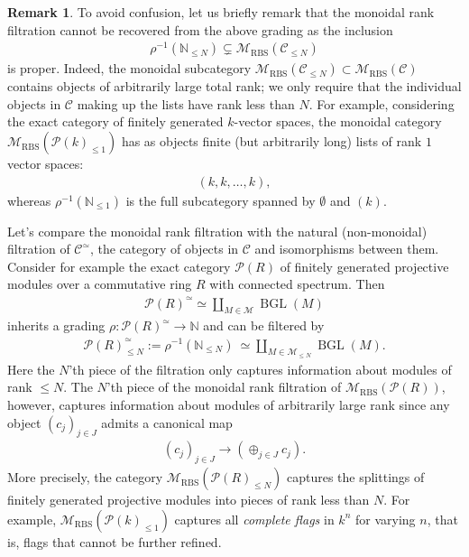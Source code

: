 \documentclass[12pt, reqno]{amsart}
\theoremstyle{plain}
\theoremstyle{definition}
\newtheorem{remark}[theorem]{Remark}
\newcommand{\N}{\mathbb N}
\begin{document}
\begin{remark}
To avoid confusion, let us briefly remark that the monoidal rank filtration cannot be recovered from the above grading as the inclusion
\begin{align*}
\rho^{-1}(\N_{\leq N})\subsetneq \mathscr{M}_{\operatorname{RBS}}(\mathcal{C}_{\leq N})
\end{align*}
is proper. Indeed, the monoidal subcategory $\mathscr{M}_{\operatorname{RBS}}(\mathcal{C}_{\leq N})\subset \mathscr{M}_{\operatorname{RBS}}(\mathcal{C})$ contains objects of arbitrarily large total rank; we only require that the individual objects in $\mathcal{C}$ making up the lists have rank less than $N$. For example, considering the exact category of finitely generated $k$-vector spaces, the monoidal category $\mathscr{M}_{\operatorname{RBS}}(\mathcal{P}(k)_{\leq 1})$ has as objects finite (but arbitrarily long) lists of rank $1$ vector spaces:
\begin{align*}
(k,k,\ldots,k),
\end{align*}
whereas $\rho^{-1}(\N_{\leq 1})$ is the full subcategory spanned by $\emptyset$ and $(k)$.

Let's compare the monoidal rank filtration with the natural (non-monoidal) filtration of $\mathcal{C}^\simeq$, the category of objects in $\mathcal{C}$ and isomorphisms between them. Consider for example the exact category $\mathcal{P}(R)$ of finitely generated projective modules over a commutative ring $R$ with connected spectrum. Then
\begin{align*}
\mathcal{P}(R)^\simeq \simeq \coprod_{M\in \mathcal{M}} \operatorname{BGL}(M)
\end{align*}
inherits a grading $\rho\colon \mathcal{P}(R)^\simeq\rightarrow \N$ and can be filtered by
\begin{align*}
\mathcal{P}(R)^\simeq_{\leq N}:=\rho^{-1}(\N_{\leq N})\ \simeq \coprod_{M\in \mathcal{M}_{\leq N}} \operatorname{BGL}(M).
\end{align*}
Here the $N$'th piece of the filtration only captures information about modules of rank $\leq N$. The $N$'th piece of the monoidal rank filtration of $\mathscr{M}_{\operatorname{RBS}}(\mathcal{P}(R))$, however, captures information about modules of arbitrarily large rank since any object $(c_j)_{j\in J}$ admits a canonical map
\begin{align*}
(c_j)_{j\in J}\rightarrow (\oplus_{j\in J}c_j).
\end{align*}
More precisely, the category $\mathscr{M}_{\operatorname{RBS}}(\mathcal{P}(R)_{\leq N})$ captures the splittings of finitely generated projective modules into pieces of rank less than $N$. For example, $\mathscr{M}_{\operatorname{RBS}}(\mathcal{P}(k)_{\leq 1})$ captures all \textit{complete flags} in $k^n$ for varying $n$, that is, flags that cannot be further refined.
\end{remark}
\end{document}
